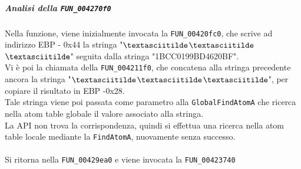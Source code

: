 \documentclass[12pt]{extarticle}
\begin{document}
\subparagraph{Analisi della \texttt{FUN\_004270f0}}
Nella funzione, viene inizialmente invocata la \texttt{FUN\_00420fc0}, che scrive ad indirizzo EBP - 0x44 la stringa "$\textasciitilde$$\textasciitilde$$\textasciitilde$" seguita dalla stringa "1BCC0199BD4620BF".\\Vi è poi la chiamata della \texttt{FUN\_004211f0}, che concatena alla stringa precedente ancora la stringa "$\textasciitilde$$\textasciitilde$$\textasciitilde$", per copiare il risultato in EBP -0x28.\\Tale stringa viene poi passata come parametro alla \texttt{GlobalFindAtomA} che ricerca nella atom table globale il valore associato alla stringa.\\La API non trova la corrispondenza, quindi si effettua una ricerca nella atom table locale mediante la \texttt{FindAtomA}, nuovamente senza successo.\\\\Si ritorna nella \texttt{FUN\_00429ea0} e viene invocata la \texttt{FUN\_00423740}  
\end{document}
